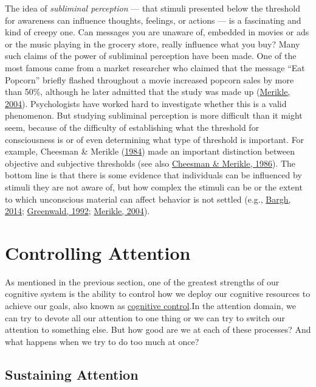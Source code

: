 \documentclass[
]{krantz}
\begin{document}
The idea of \emph{subliminal perception} --- that stimuli presented below the threshold for awareness can influence thoughts, feelings, or actions --- is a fascinating and kind of creepy one. Can messages you are unaware of, embedded in movies or ads or the music playing in the grocery store, really influence what you buy? Many such claims of the power of subliminal perception have been made. One of the most famous came from a market researcher who claimed that the message ``Eat Popcorn'' briefly flashed throughout a movie increased popcorn sales by more than 50\%, although he later admitted that the study was made up (\protect\hyperlink{ref-Merikle2004}{Merikle, 2004}). Psychologists have worked hard to investigate whether this is a valid phenomenon. But studying subliminal perception is more difficult than it might seem, because of the difficulty of establishing what the threshold for consciousness is or of even determining what type of threshold is important. For example, Cheesman \& Merikle (\protect\hyperlink{ref-Cheesman1984}{1984}) made an important distinction between objective and subjective thresholds (see also \protect\hyperlink{ref-Cheesman1986}{Cheesman \& Merikle, 1986}). The bottom line is that there is some evidence that individuals can be influenced by stimuli they are not aware of, but how complex the stimuli can be or the extent to which unconscious material can affect behavior is not settled (e.g., \protect\hyperlink{ref-Bargh2014}{Bargh, 2014}; \protect\hyperlink{ref-Greenwald1992}{Greenwald, 1992}; \protect\hyperlink{ref-Merikle2004}{Merikle, 2004}).

\hypertarget{controlling-attention}{%
\section{Controlling Attention}\label{controlling-attention}}

As mentioned in the previous section, one of the greatest strengths of our cognitive system is the ability to control how we deploy our cognitive resources to achieve our goals, also known as \protect\hyperlink{cognitive-control}{cognitive control}.In the attention domain, we can try to devote all our attention to one thing or we can try to switch our attention to something else. But how good are we at each of these processes? And what happens when we try to do too much at once?

\hypertarget{sustaining-attention}{%
\subsection*{Sustaining Attention}\label{sustaining-attention}}
\end{document}
